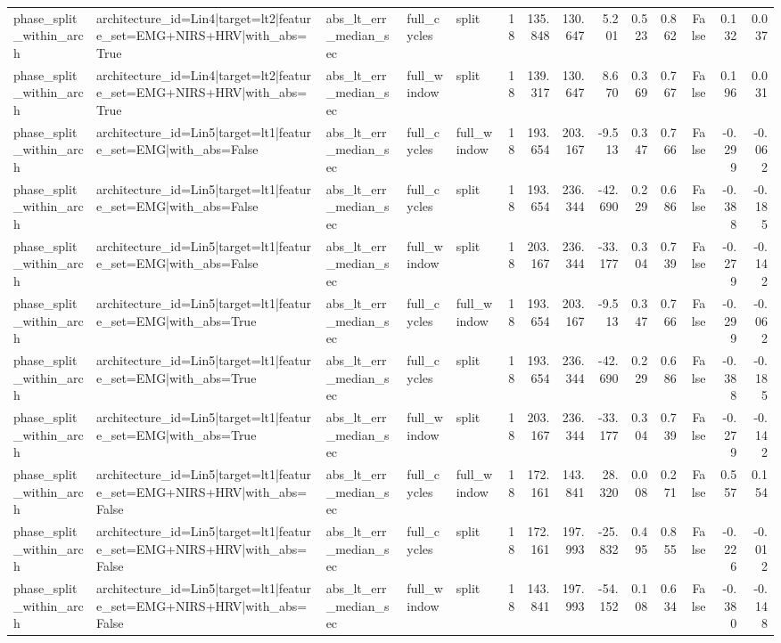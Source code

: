 \begin{table}
\begin{tabular}{lllllrrrrrrrrr}
phase_split_within_arch & architecture_id=Lin4|target=lt2|feature_set=EMG+NIRS+HRV|with_abs=True & abs_lt_err_median_sec & full_cycles & split & 18 & 135.848 & 130.647 & 5.201 & 0.523 & 0.862 & False & 0.132 & 0.037 \\
phase_split_within_arch & architecture_id=Lin4|target=lt2|feature_set=EMG+NIRS+HRV|with_abs=True & abs_lt_err_median_sec & full_window & split & 18 & 139.317 & 130.647 & 8.670 & 0.369 & 0.767 & False & 0.196 & 0.031 \\
phase_split_within_arch & architecture_id=Lin5|target=lt1|feature_set=EMG|with_abs=False & abs_lt_err_median_sec & full_cycles & full_window & 18 & 193.654 & 203.167 & -9.513 & 0.347 & 0.766 & False & -0.299 & -0.062 \\
phase_split_within_arch & architecture_id=Lin5|target=lt1|feature_set=EMG|with_abs=False & abs_lt_err_median_sec & full_cycles & split & 18 & 193.654 & 236.344 & -42.690 & 0.229 & 0.686 & False & -0.388 & -0.185 \\
phase_split_within_arch & architecture_id=Lin5|target=lt1|feature_set=EMG|with_abs=False & abs_lt_err_median_sec & full_window & split & 18 & 203.167 & 236.344 & -33.177 & 0.304 & 0.739 & False & -0.279 & -0.142 \\
phase_split_within_arch & architecture_id=Lin5|target=lt1|feature_set=EMG|with_abs=True & abs_lt_err_median_sec & full_cycles & full_window & 18 & 193.654 & 203.167 & -9.513 & 0.347 & 0.766 & False & -0.299 & -0.062 \\
phase_split_within_arch & architecture_id=Lin5|target=lt1|feature_set=EMG|with_abs=True & abs_lt_err_median_sec & full_cycles & split & 18 & 193.654 & 236.344 & -42.690 & 0.229 & 0.686 & False & -0.388 & -0.185 \\
phase_split_within_arch & architecture_id=Lin5|target=lt1|feature_set=EMG|with_abs=True & abs_lt_err_median_sec & full_window & split & 18 & 203.167 & 236.344 & -33.177 & 0.304 & 0.739 & False & -0.279 & -0.142 \\
phase_split_within_arch & architecture_id=Lin5|target=lt1|feature_set=EMG+NIRS+HRV|with_abs=False & abs_lt_err_median_sec & full_cycles & full_window & 18 & 172.161 & 143.841 & 28.320 & 0.008 & 0.271 & False & 0.557 & 0.154 \\
phase_split_within_arch & architecture_id=Lin5|target=lt1|feature_set=EMG+NIRS+HRV|with_abs=False & abs_lt_err_median_sec & full_cycles & split & 18 & 172.161 & 197.993 & -25.832 & 0.495 & 0.855 & False & -0.226 & -0.012 \\
phase_split_within_arch & architecture_id=Lin5|target=lt1|feature_set=EMG+NIRS+HRV|with_abs=False & abs_lt_err_median_sec & full_window & split & 18 & 143.841 & 197.993 & -54.152 & 0.108 & 0.634 & False & -0.380 & -0.148 \\

\end{tabular}
\end{table}
